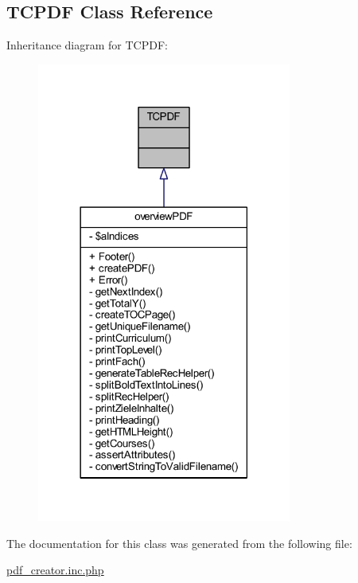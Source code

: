 \hypertarget{class_t_c_p_d_f}{\subsection{T\+C\+P\+D\+F Class Reference}
\label{class_t_c_p_d_f}
}


Inheritance diagram for T\+C\+P\+D\+F\+:
\nopagebreak
\begin{figure}[H]
\begin{center}
\leavevmode
\includegraphics[width=237pt]{class_t_c_p_d_f__inherit__graph}
\end{center}
\end{figure}


The documentation for this class was generated from the following file\+:\begin{DoxyCompactItemize}
\item 
\hyperlink{pdf__creator_8inc_8php}{pdf\+\_\+creator.\+inc.\+php}\end{DoxyCompactItemize}

